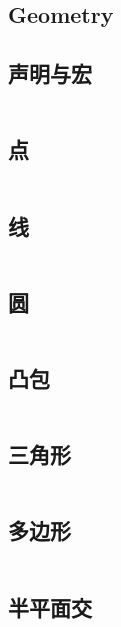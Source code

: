 \documentclass[titlepage, a4paper]{article}
\begin{document}
	\begin{titlepage}
		
	\end{titlepage}
	\begin{multicols}{2}
		\setcounter{tocdepth}{3}
		\begingroup
		\let\cleardoublepage\relax
		\let\clearpage\relax
		\begin{small}
		\begin{spacing}{0.70}
		\tableofcontents
		\end{spacing}
		\end{small}
		\newpage
		\begin{spacing}{0.6}
			
			\section{Geometry}
				\subsection{声明与宏}
					\inputminted{cpp}{src/Geometry/GeoDefine.cpp}
				\subsection{点}
					\inputminted{cpp}{src/Geometry/Point.cpp}
				\subsection{线}
					\inputminted{cpp}{src/Geometry/Line.cpp}
				\subsection{圆}
					\inputminted{cpp}{src/Geometry/circle.cpp}
				\subsection{凸包}
					\inputminted{cpp}{src/Geometry/Convex.cpp}
				\subsection{三角形}
					\inputminted{cpp}{src/Geometry/Triangle.cpp}
				\subsection{多边形}
					\inputminted{cpp}{src/Geometry/Polygon.cpp}
				\subsection{半平面交}
					\inputminted{cpp}{src/Geometry/HalfPlaneIntersection.cpp}


\end{spacing}
\end{multicols}
\end{document}
